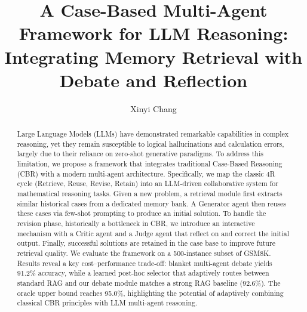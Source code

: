 \documentclass[runningheads]{llncs}
\begin{document}
\title{A Case-Based Multi-Agent Framework for LLM Reasoning: Integrating Memory Retrieval with Debate and Reflection}


\author{Xinyi Chang}

\maketitle

\begin{abstract}
Large Language Models (LLMs) have demonstrated remarkable capabilities in complex reasoning, yet they remain susceptible to logical hallucinations and calculation errors, largely due to their reliance on zero-shot generative paradigms. To address this limitation, we propose a framework that integrates traditional Case-Based Reasoning (CBR) with a modern multi-agent architecture. Specifically, we map the classic 4R cycle (Retrieve, Reuse, Revise, Retain) into an LLM-driven collaborative system for mathematical reasoning tasks. Given a new problem, a retrieval module first extracts similar historical cases from a dedicated memory bank. A Generator agent then reuses these cases via few-shot prompting to produce an initial solution. To handle the revision phase, historically a bottleneck in CBR, we introduce an interactive mechanism with a Critic agent and a Judge agent that reflect on and correct the initial output. Finally, successful solutions are retained in the case base to improve future retrieval quality. We evaluate the framework on a 500-instance subset of GSM8K. Results reveal a key cost--performance trade-off: blanket multi-agent debate yields 91.2\% accuracy, while a learned post-hoc selector that adaptively routes between standard RAG and our debate module matches a strong RAG baseline (92.6\%). The oracle upper bound reaches 95.0\%, highlighting the potential of adaptively combining classical CBR principles with LLM multi-agent reasoning.

\end{abstract}







\end{document}
